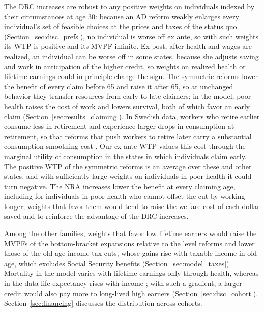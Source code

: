 The DRC increases are robust to any positive weights on individuals indexed by their circumstances at age 30: because an AD reform weakly enlarges every individual's set of feasible choices at the prices and taxes of the status quo (Section~\ref{sec:disc_prefs}), no individual is worse off ex ante, so with such weights its WTP is positive and its MVPF infinite. Ex post, after health and wages are realized, an individual can be worse off in some states, because she adjusts saving and work in anticipation of the higher credit, so weights on realized health or lifetime earnings could in principle change the sign. The symmetric reforms lower the benefit of every claim before 65 and raise it after 65, so at unchanged behavior they transfer resources from early to late claimers; in the model, poor health raises the cost of work and lowers survival, both of which favor an early claim (Section~\ref{sec:results_claiming}). In Swedish data, workers who retire earlier consume less in retirement and experience larger drops in consumption at retirement, so that reforms that push workers to retire later carry a substantial consumption-smoothing cost \citep{Kolsrud2024retirement}. Our ex ante WTP values this cost through the marginal utility of consumption in the states in which individuals claim early. The positive WTP of the symmetric reforms is an average over these and other states, and with sufficiently large weights on individuals in poor health it could turn negative. The NRA increases lower the benefit at every claiming age, including for individuals in poor health who cannot offset the cut by working longer; weights that favor them would tend to raise the welfare cost of each dollar saved and to reinforce the advantage of the DRC increases.

Among the other families, weights that favor low lifetime earners would raise the MVPFs of the bottom-bracket expansions relative to the level reforms and lower those of the old-age income-tax cuts, whose gains rise with taxable income in old age, which excludes Social Security benefits (Section~\ref{sec:model_taxes}). Mortality in the model varies with lifetime earnings only through health, whereas in the data life expectancy rises with income \citep{chetty2016association}; with such a gradient, a larger credit would also pay more to long-lived high earners (Section~\ref{sec:disc_cohort}). Section~\ref{sec:financing} discusses the distribution across cohorts.
